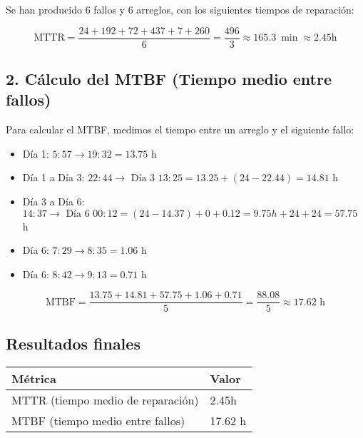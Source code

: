 Se han producido 6 fallos y 6 arreglos, con los siguientes tiempos de reparación:

\[
    \text{MTTR} = \frac{24+192+72+437+7+260}{6} = \frac{496}{3}\approx\qty{165.3}{\min} \approx \boxed{2.45 \text{h}}
\]

\subsection{2. Cálculo del MTBF (Tiempo medio entre fallos)}\label{subsec:2.-calculo-del-mtbf-(tiempo-medio-entre-fallos)}

Para calcular el MTBF, medimos el tiempo entre un arreglo y el siguiente fallo:

\begin{itemize}
    \item Día 1: $5:57 \rightarrow 19:32 = 13.75$ h
    \item Día 1 a Día 3: $22:44 \rightarrow \text{ Día 3 } 13:25 = 13.25 + (24 - 22.44) = 14.81$ h
    \item Día 3 a Día 6: $14:37 \rightarrow \text{ Día 6 } 00:12 = (24-14.37)+0+0.12 = 9.75 h + 24 + 24 = 57.75$ h
    \item Día 6: $7:29 \rightarrow 8:35 = 1.06$ h
    \item Día 6: $8:42 \rightarrow 9:13 =  0.71$ h
\end{itemize}

\[
    \text{MTBF} = \frac{13.75 + 14.81 + 57.75 + 1.06 + 0.71}{5} = \frac{88.08}{5} \approx \boxed{17.62 \text{ h}}
\]

\subsection{Resultados finales}\label{subsec:resultados-finales}

\begin{tabular}{ll}
    \toprule
    \textbf{Métrica}                  & \textbf{Valor} \\
    \midrule
    MTTR (tiempo medio de reparación) & 2.45h          \\
    MTBF (tiempo medio entre fallos)  & 17.62 h        \\
    \bottomrule
\end{tabular}
